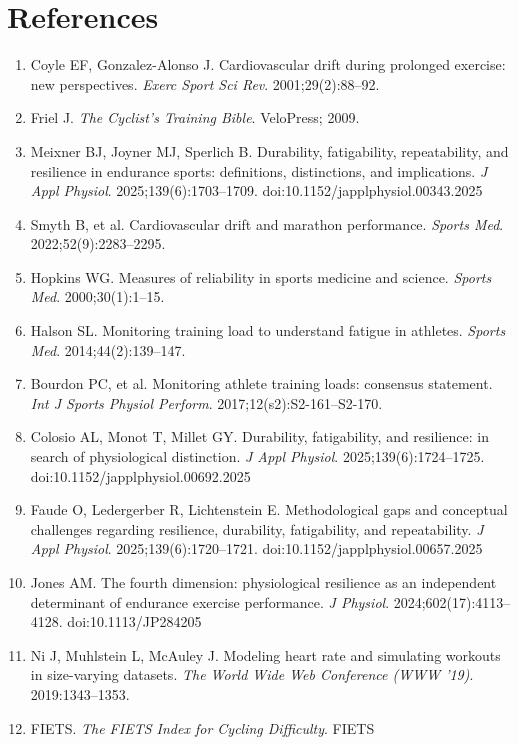 \documentclass[12pt]{article}
\begin{document}
\section*{References}
\begin{enumerate}
  \item Coyle EF, Gonzalez-Alonso J. Cardiovascular drift during prolonged
  exercise: new perspectives. \textit{Exerc Sport Sci Rev}.
  2001;29(2):88--92.
  \item Friel J. \textit{The Cyclist's Training Bible}. VeloPress; 2009.
  \item Meixner BJ, Joyner MJ, Sperlich B. Durability, fatigability,
  repeatability, and resilience in endurance sports: definitions,
  distinctions, and implications. \textit{J Appl Physiol}.
  2025;139(6):1703--1709. doi:10.1152/japplphysiol.00343.2025
  \item Smyth B, et al. Cardiovascular drift and marathon performance.
  \textit{Sports Med}. 2022;52(9):2283--2295.
  \item Hopkins WG. Measures of reliability in sports medicine and science.
  \textit{Sports Med}. 2000;30(1):1--15.
  \item Halson SL. Monitoring training load to understand fatigue in
  athletes. \textit{Sports Med}. 2014;44(2):139--147.
  \item Bourdon PC, et al. Monitoring athlete training loads: consensus
  statement. \textit{Int J Sports Physiol Perform}.
  2017;12(s2):S2-161--S2-170.
  \item Colosio AL, Monot T, Millet GY. Durability, fatigability, and
  resilience: in search of physiological distinction. \textit{J Appl
  Physiol}. 2025;139(6):1724--1725. doi:10.1152/japplphysiol.00692.2025
  \item Faude O, Ledergerber R, Lichtenstein E. Methodological gaps and
  conceptual challenges regarding resilience, durability, fatigability, and
  repeatability. \textit{J Appl Physiol}. 2025;139(6):1720--1721.
  doi:10.1152/japplphysiol.00657.2025
  \item Jones AM. The fourth dimension: physiological resilience as an
  independent determinant of endurance exercise performance. \textit{J
  Physiol}. 2024;602(17):4113--4128. doi:10.1113/JP284205
  \item Ni J, Muhlstein L, McAuley J. Modeling heart rate and simulating
  workouts in size-varying datasets. \textit{The World Wide Web Conference
  (WWW '19)}. 2019:1343--1353.
  \item FIETS. \textit{The FIETS Index for Cycling Difficulty}. FIETS

\end{enumerate}
\end{document}
